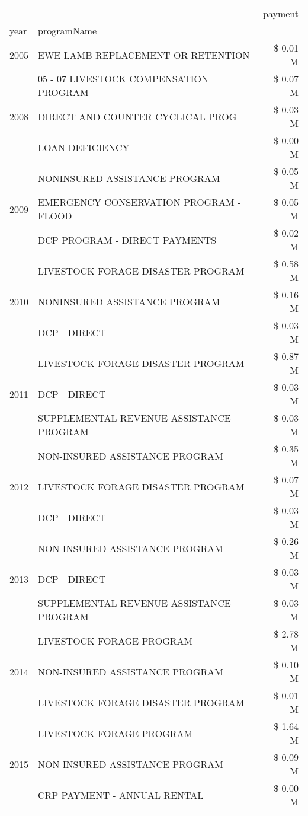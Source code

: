 \begin{tabular}{llr}
\toprule
 &  & payment \\
year & programName &  \\
\midrule
2005 & EWE LAMB REPLACEMENT OR RETENTION & \$ 0.01 M \\
\cline{1-3}
\multirow[t]{3}{*}{2008} & 05 - 07 LIVESTOCK COMPENSATION PROGRAM & \$ 0.07 M \\
 & DIRECT AND COUNTER CYCLICAL PROG & \$ 0.03 M \\
 & LOAN DEFICIENCY & \$ 0.00 M \\
\cline{1-3}
\multirow[t]{3}{*}{2009} & NONINSURED ASSISTANCE PROGRAM & \$ 0.05 M \\
 & EMERGENCY CONSERVATION PROGRAM - FLOOD & \$ 0.05 M \\
 & DCP PROGRAM - DIRECT PAYMENTS & \$ 0.02 M \\
\cline{1-3}
\multirow[t]{3}{*}{2010} & LIVESTOCK FORAGE DISASTER PROGRAM & \$ 0.58 M \\
 & NONINSURED ASSISTANCE PROGRAM & \$ 0.16 M \\
 & DCP - DIRECT & \$ 0.03 M \\
\cline{1-3}
\multirow[t]{3}{*}{2011} & LIVESTOCK FORAGE DISASTER PROGRAM & \$ 0.87 M \\
 & DCP - DIRECT & \$ 0.03 M \\
 & SUPPLEMENTAL REVENUE ASSISTANCE PROGRAM & \$ 0.03 M \\
\cline{1-3}
\multirow[t]{3}{*}{2012} & NON-INSURED ASSISTANCE PROGRAM & \$ 0.35 M \\
 & LIVESTOCK FORAGE DISASTER PROGRAM & \$ 0.07 M \\
 & DCP - DIRECT & \$ 0.03 M \\
\cline{1-3}
\multirow[t]{3}{*}{2013} & NON-INSURED ASSISTANCE PROGRAM & \$ 0.26 M \\
 & DCP - DIRECT & \$ 0.03 M \\
 & SUPPLEMENTAL REVENUE ASSISTANCE PROGRAM & \$ 0.03 M \\
\cline{1-3}
\multirow[t]{3}{*}{2014} & LIVESTOCK FORAGE PROGRAM & \$ 2.78 M \\
 & NON-INSURED ASSISTANCE PROGRAM & \$ 0.10 M \\
 & LIVESTOCK FORAGE DISASTER PROGRAM & \$ 0.01 M \\
\cline{1-3}
\multirow[t]{3}{*}{2015} & LIVESTOCK FORAGE PROGRAM & \$ 1.64 M \\
 & NON-INSURED ASSISTANCE PROGRAM & \$ 0.09 M \\
 & CRP PAYMENT - ANNUAL RENTAL & \$ 0.00 M \\

\end{tabular}
